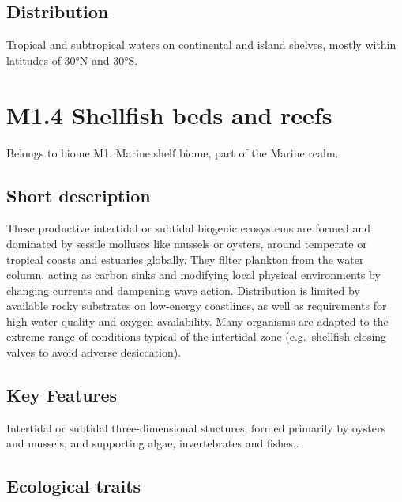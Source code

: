 \documentclass[
  letterpaper,
  DIV=11,
  numbers=noendperiod]{scrartcl}
\begin{document}
\subsection{Distribution}\label{distribution-28}

Tropical and subtropical waters on continental and island shelves,
mostly within latitudes of 30°N and 30°S.

\section{M1.4 Shellfish beds and
reefs}\label{m1.4-shellfish-beds-and-reefs}

Belongs to biome M1. Marine shelf biome, part of the Marine realm.

\subsection{Short description}\label{short-description-29}

These productive intertidal or subtidal biogenic ecosystems are formed
and dominated by sessile molluscs like mussels or oysters, around
temperate or tropical coasts and estuaries globally. They filter
plankton from the water column, acting as carbon sinks and modifying
local physical environments by changing currents and dampening wave
action. Distribution is limited by available rocky substrates on
low-energy coastlines, as well as requirements for high water quality
and oxygen availability. Many organisms are adapted to the extreme range
of conditions typical of the intertidal zone (e.g.~shellfish closing
valves to avoid adverse desiccation).

\subsection{Key Features}\label{key-features-29}

Intertidal or subtidal three-dimensional stuctures, formed primarily by
oysters and mussels, and supporting algae, invertebrates and fishes..

\subsection{Ecological traits}\label{ecological-traits-29}
\end{document}

